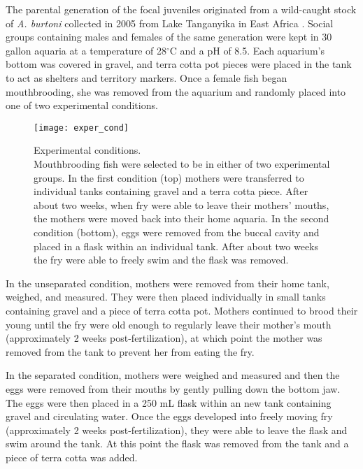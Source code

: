 \documentclass[12pt,twoside]{reedthesis}
\begin{document}
The parental generation of the focal juveniles originated from a wild-caught
stock of \textit{A. burtoni} collected in 2005 from Lake Tanganyika in East
Africa \citep{renn_maternal_2009}.
Social groups containing males and females of the same generation were kept in
30 gallon aquaria at a temperature of 28$^\circ$C and a pH of 8.5. Each aquarium's bottom
was covered in gravel, and terra cotta pot pieces were placed in the tank to act
as shelters and territory markers. Once a female fish began mouthbrooding, she
was removed from the aquarium and randomly placed into one of two experimental
conditions.

\begin{figure}[htbp] 
\begin{centering} 
\texttt{[image: exper\_cond]}
\caption[Experimental conditions]{\footnotesize{Experimental conditions.\\
    Mouthbrooding fish were selected to be in either of two experimental groups.
  In the first condition (top) mothers were transferred to individual tanks
  containing gravel and a terra cotta piece. After about two weeks, when fry were
able to leave their mothers' mouths, the mothers were moved back into their home
aquaria. In the second condition (bottom), eggs were removed from the buccal
cavity and placed in a flask within an individual tank. After about two weeks
the fry were able to freely swim and the flask was removed.}} 
\label{subd}
\end{centering} 
\end{figure}

In the unseparated condition, mothers were removed from their home tank,
weighed, and measured. They were then placed individually in small tanks containing gravel
and a piece of terra cotta pot. Mothers continued to brood their young until the
fry were old enough to regularly leave their mother's mouth (approximately 2 weeks post-fertilization), at which point the mother was removed from the tank to prevent her from eating the fry. 

In the separated condition, mothers were weighed and measured and then the eggs
were removed from their mouths by gently pulling down the bottom
jaw. The eggs were then placed in a 250 mL flask within an new tank containing
gravel and circulating water. Once
the eggs developed into freely moving fry (approximately 2 weeks
post-fertilization), they were able to leave the flask and swim around the tank.
At this point the flask was removed from the tank and a piece of terra cotta was added.
\end{document}
